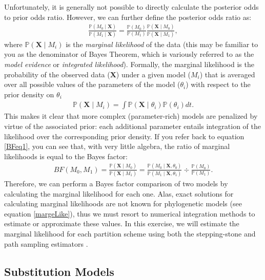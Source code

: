 Unfortunately, it is generally not possible to directly calculate the posterior odds to prior odds ratio. 
However, we can further define the posterior odds ratio as:
\begin{align*}
\frac{\mathbb{P}(M_0 \mid \mathbf X)}{\mathbb{P}(M_1 \mid \mathbf X)} = \frac{\mathbb{P}(M_0)}{\mathbb{P}(M_1)} \frac{\mathbb{P}(\mathbf X \mid M_0)}{\mathbb{P}(\mathbf X \mid M_1)},
\end{align*}
where $\mathbb{P}(\mathbf X \mid M_i)$ is the \textit{marginal likelihood} of the data (this may be familiar to you as the denominator of Bayes Theorem, which is variously referred to as the \textit{model evidence} or \textit{integrated likelihood}).
Formally, the marginal likelihood is the probability of the observed data ($\mathbf X$) under a given model ($M_i$) that is averaged over all possible values of the parameters of the model ($\theta_i$) with respect to the prior density on $\theta_i$
\begin{align}\label{margeLike}
\mathbb{P}(\mathbf X \mid M_i) = \int \mathbb{P}(\mathbf X \mid \theta_i) \mathbb{P}(\theta_i)dt.
\end{align}
This makes it clear that more complex (parameter-rich) models are penalized by virtue of the associated prior: each additional parameter entails integration of the likelihood over the corresponding prior density.  
If you refer back to equation \ref{BFeq1}, you can see that, with very little algebra, the ratio of marginal likelihoods is equal to the Bayes factor:
\begin{align}\label{bfFormula}
BF(M_0,M_1) = \frac{\mathbb{P}(\mathbf X \mid M_0)}{\mathbb{P}(\mathbf X \mid M_1)} = \frac{\mathbb{P}(M_0 \mid \mathbf X, \theta_0)}{\mathbb{P}(M_1 \mid \mathbf X, \theta_1)} \div \frac{\mathbb{P}(M_0)}{\mathbb{P}(M_1)}. 
\end{align}
Therefore, we can perform a Bayes factor comparison of two models by calculating the marginal likelihood for each one. %
Alas, exact solutions for calculating marginal likelihoods are not known for phylogenetic models (see equation \ref{margeLike}), thus we must resort to numerical integration methods to estimate or approximate these values. 
In this exercise, we will estimate the marginal likelihood for each partition scheme
using both the stepping-stone \citep{Xie2011,Fan2011} and path sampling estimators \citep{Lartillot2006, Baele2012}. 



\bigskip
\subsection{Substitution Models}\label{secUnif} 

